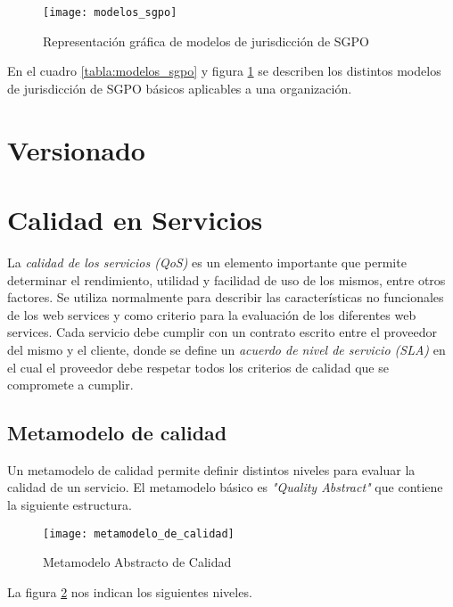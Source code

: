   \begin{figure}[h]
    \centering
    \texttt{[image: modelos\_sgpo]}
    \caption{Representación gráfica de modelos de jurisdicción de SGPO \cite{Erl:2011:SGG:1983453}}
    \label{imagen:modelos_sgpo}
  \end{figure}

  En el cuadro \ref{tabla:modelos_sgpo} y figura \ref{imagen:modelos_sgpo} se describen los distintos modelos de jurisdicción de SGPO básicos aplicables a una organización.

\section{Versionado}
\label{MarcoConceptual:versionado}

\section{Calidad en Servicios}
\label{MarcoConceptual:calidad}
La \emph{calidad de los servicios (QoS)} es un elemento importante que permite determinar el rendimiento, utilidad y facilidad de uso de los mismos, entre otros factores.
Se utiliza normalmente para describir las características no funcionales de los web services y como criterio para la evaluación de los diferentes web services.
Cada servicio debe cumplir con un contrato escrito entre el proveedor del mismo y el cliente, donde se define un \emph{acuerdo de nivel de servicio (SLA)} en el cual el proveedor debe respetar todos los criterios de calidad que se compromete a cumplir. \cite{Bool:QoSWS}

\subsection{Metamodelo de calidad}
\label{MarcoConceptual:metamodelo_calidad}
Un metamodelo de calidad permite definir distintos niveles para evaluar la calidad de un servicio. El metamodelo básico es \emph{"Quality Abstract"} que contiene la siguiente estructura.  \cite{InCo:Seminario}
  \begin{figure}[h]
    \centering
    \texttt{[image: metamodelo\_de\_calidad]}
    \caption{Metamodelo Abstracto de Calidad}
    \label{figura:metamodelo_de_calidad}
  \end{figure}

La figura \ref{figura:metamodelo_de_calidad} nos indican los siguientes niveles.

